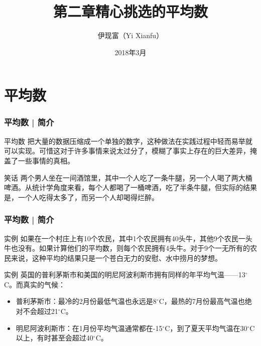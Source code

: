 



\title[平均数]{第二章\quad 精心挑选的平均数}
\author[Yixf]{伊现富（Yi Xianfu）}
\date{2018年3月}



\section{平均数}
\begin{frame}
  \frametitle{平均数 | 简介}
  \begin{block}{平均数}
把大量的数据压缩成一个单独的数字，这种做法在实践过程中轻而易举就可以实现。可惜这对于许多事情来说太过分了，模糊了事实上存在的巨大差异，掩盖了一些事情的真相。
  \end{block}
  \pause
  \begin{block}{笑话}
两个男人坐在一间酒馆里，其中一个人吃了一条牛腿，另一个人喝了两大桶啤酒。从统计学角度来看，每个人都喝了一桶啤酒，吃了半条牛腿，但实际的结果是，一个人吃得太多了，而另一个人却喝得烂醉。
  \end{block}
\end{frame}

\begin{frame}
  \frametitle{平均数 | 简介}
  \begin{block}{实例}
如果在一个村庄上有10个农民，其中1个农民拥有40头牛，其他9个农民一头牛也没有。如果计算他们的平均数，则每个农民拥有4头牛。对于9个一无所有的农民来说，这种平均的结果只是一个苍白无力的安慰、水中捞月的梦想。
  \end{block}
  \pause
  \begin{block}{实例}
    英国的普利茅斯市和美国的明尼阿波利斯市拥有同样的年平均气温——13$^{\circ}$C。而真实的气候：
    \begin{itemize}
      \item 普利茅斯市：最冷的2月份最低气温也永远是8$^{\circ}$C，最热的7月份最高气温也绝对不会超过21$^{\circ}$C。
      \item 明尼阿波利斯市：在1月份平均气温通常都在-15$^{\circ}$C，到了夏天平均气温在30$^{\circ}$C以上，有时甚至会超过40$^{\circ}$C。
    \end{itemize}
  \end{block}
\end{frame}

